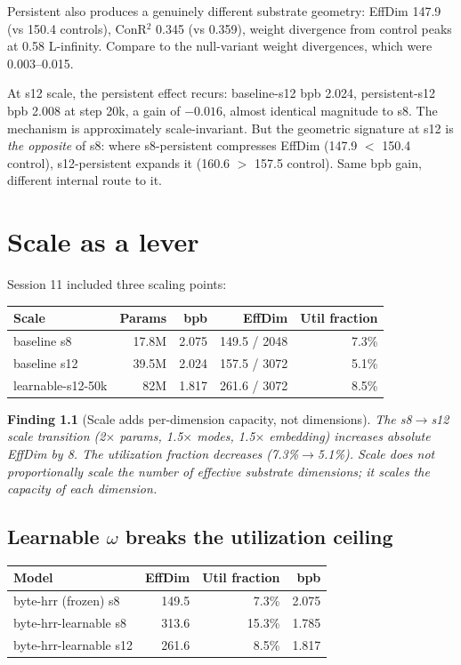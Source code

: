 \documentclass[11pt,openany]{book}
\newtheorem{finding}{Finding}[chapter]
\begin{document}
Persistent also produces a genuinely different substrate geometry:
EffDim 147.9 (vs 150.4 controls), ConR$^2$ 0.345 (vs 0.359), weight
divergence from control peaks at 0.58 L-infinity. Compare to the
null-variant weight divergences, which were 0.003--0.015.

At s12 scale, the persistent effect recurs: baseline-s12 bpb 2.024,
persistent-s12 bpb 2.008 at step 20k, a gain of $-0.016$, almost
identical magnitude to s8. The mechanism is approximately
scale-invariant. But the geometric signature at s12 is
\emph{the opposite} of s8: where s8-persistent compresses EffDim
(147.9 $<$ 150.4 control), s12-persistent expands it (160.6 $>$ 157.5
control). Same bpb gain, different internal route to it.

\chapter{Scale as a lever}

Session 11 included three scaling points:

\begin{longtable}{lrrrr}
\toprule
Scale & Params & bpb & EffDim & Util fraction \\
\midrule
baseline s8 & 17.8M & 2.075 & 149.5 / 2048 & 7.3\% \\
baseline s12 & 39.5M & 2.024 & 157.5 / 3072 & 5.1\% \\
learnable-s12-50k & 82M & 1.817 & 261.6 / 3072 & 8.5\% \\
\bottomrule
\end{longtable}

\begin{finding}[Scale adds per-dimension capacity, not dimensions]
The s8$\to$s12 scale transition (2$\times$ params, 1.5$\times$ modes,
1.5$\times$ embedding) increases absolute EffDim by 8. The
utilization \emph{fraction} decreases (7.3\%$\to$5.1\%). Scale does
not proportionally scale the number of effective substrate dimensions;
it scales the capacity of each dimension.
\end{finding}

\section{Learnable $\omega$ breaks the utilization ceiling}

\begin{longtable}{lrrr}
\toprule
Model & EffDim & Util fraction & bpb \\
\midrule
byte-hrr (frozen) s8 & 149.5 & 7.3\% & 2.075 \\
byte-hrr-learnable s8 & 313.6 & 15.3\% & 1.785 \\
byte-hrr-learnable s12 & 261.6 & 8.5\% & 1.817 \\
\bottomrule
\end{longtable}
\end{document}
